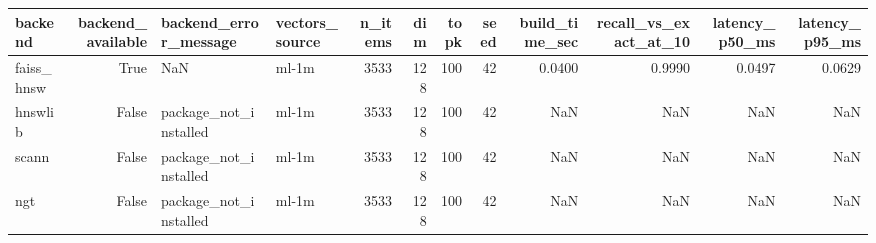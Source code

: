 \begin{tabular}{lrllrrrrrrrr}
\toprule
backend & backend_available & backend_error_message & vectors_source & n_items & dim & topk & seed & build_time_sec & recall_vs_exact_at_10 & latency_p50_ms & latency_p95_ms \\
\midrule
faiss_hnsw & True & NaN & ml-1m & 3533 & 128 & 100 & 42 & 0.0400 & 0.9990 & 0.0497 & 0.0629 \\
hnswlib & False & package_not_installed & ml-1m & 3533 & 128 & 100 & 42 & NaN & NaN & NaN & NaN \\
scann & False & package_not_installed & ml-1m & 3533 & 128 & 100 & 42 & NaN & NaN & NaN & NaN \\
ngt & False & package_not_installed & ml-1m & 3533 & 128 & 100 & 42 & NaN & NaN & NaN & NaN \\
\bottomrule
\end{tabular}
